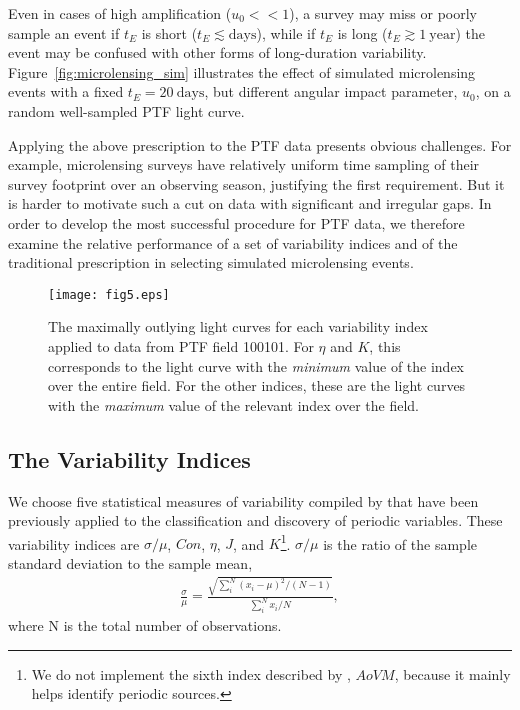 \documentclass{emulateapj}
\begin{document}
Even in cases of high amplification ($u_0<<1$), a survey may miss or poorly sample an event if $t_E$ is short ($t_E \lesssim\mathrm{days}$), while if $t_E$ is long ($t_E \gtrsim 1~\mathrm{year}$) the event may be confused with other forms of long-duration variability. Figure~\ref{fig:microlensing_sim} illustrates the effect of simulated microlensing events with a fixed $t_E=20~\mathrm{days}$, but different angular impact parameter, $u_0$, on a random well-sampled PTF light curve. 

Applying the above prescription to the PTF data presents obvious challenges. For example, microlensing surveys have relatively uniform time sampling of their survey footprint over an observing season, justifying the first requirement. But it is harder to motivate such a cut on data with significant and irregular gaps. In order to develop the most successful procedure for PTF data, we therefore examine the relative performance of a set of variability indices and of the traditional prescription in selecting simulated microlensing events.

\begin{figure}[h]
\centering\texttt{[image: fig5.eps]}
\caption{The maximally outlying light curves for each variability index applied to data from PTF field 100101. For $\eta$ and $K$, this corresponds to the light curve with the \emph{minimum} value of the index over the entire field. For the other indices, these are the light curves with the \emph{maximum} value of the relevant index over the field. } \label{fig:indices_examples}
\end{figure}

\subsection{The Variability Indices} 
We choose five statistical measures of variability compiled by \cite{shin2009} that have been previously applied to the classification and discovery of periodic variables. These variability indices are $\sigma/\mu$, $Con$, $\eta$, $J$, and $K$\footnote{We do not implement the sixth index described by \cite{shin2009}, $AoVM$, because it mainly helps identify periodic sources.}. $\sigma/\mu$ is the ratio of the sample standard deviation to the sample mean, 
\begin{align}
	\frac{\sigma}{\mu} = \frac{\sqrt{\sum^N_i (x_i - \mu)^2 / (N-1)}}{\sum^N_i x_i/N},
\end{align}
where N is the total number of observations. 
\end{document}
